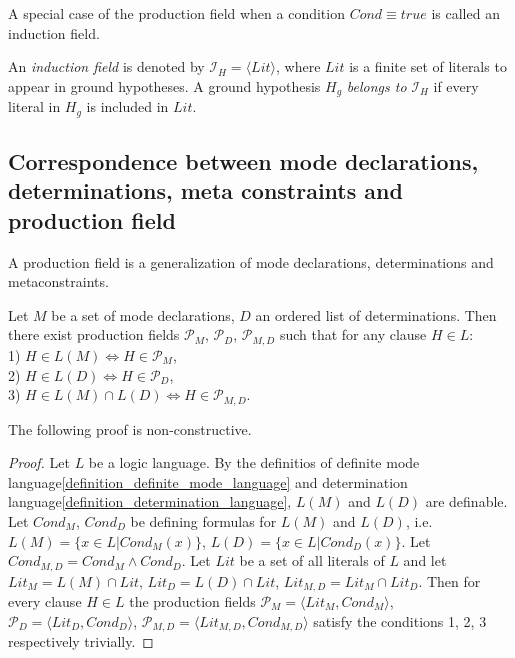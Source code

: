 A special case of the production field when a condition $Cond \equiv true$ is called an induction field.

\begin{defn}\cite{yamamoto2012inverse}\label{induction_field_definition}
An \emph{induction field} is denoted by $\mathcal{I}_H = \langle Lit \rangle$,
where $Lit$ is a finite
set of literals to appear in ground hypotheses.
A ground hypothesis $H_g$ \emph{belongs to} $\mathcal{I}_H$ if
every literal in $H_g$ is included in $Lit$.
\end{defn}

\subsection{Correspondence between mode declarations, determinations, meta constraints and production field}\label{bias_correspondence}
A production field is a generalization of mode declarations, determinations and metaconstraints.

\begin{proposition}\label{md_d_pf_correspondence_proposition}
Let $M$ be a set of mode declarations, $D$ an ordered list of determinations. Then there exist production fields
$\mathcal{P}_M$,
$\mathcal{P}_D$,
$\mathcal{P}_{M,D}$
such that for any clause $H \in L$:\\
1) $H \in L(M) \iff H \in \mathcal{P}_M$,\\
2) $H \in L(D) \iff H \in \mathcal{P}_D$,\\
3) $H \in L(M) \cap L(D) \iff H \in \mathcal{P}_{M,D}$.\\
\end{proposition}
The following proof is non-constructive.
\begin{proof}
Let $L$ be a logic language. By the definitios of definite mode language\ref{definition_definite_mode_language} and determination language\ref{definition_determination_language}, $L(M)$ and $L(D)$ are definable.
Let $Cond_M$, $Cond_D$ be defining formulas for $L(M)$ and $L(D)$, i.e. $L(M)=\{x \in L | Cond_M(x)\}$, $L(D)=\{x \in L | Cond_D(x)\}$.
Let $Cond_{M,D}=Cond_M \land Cond_D$. Let $Lit$ be a set of all literals of $L$ and let
$Lit_M=L(M) \cap Lit$,
$Lit_D=L(D) \cap Lit$,
$Lit_{M,D}=Lit_M \cap Lit_D$.
Then for every clause $H \in L$ the production fields
$\mathcal{P}_M=\langle Lit_M, Cond_M \rangle$,
$\mathcal{P}_D=\langle Lit_D, Cond_D \rangle$,
$\mathcal{P}_{M,D}=\langle Lit_{M,D}, Cond_{M,D} \rangle$
satisfy the conditions 1, 2, 3 respectively trivially.
\end{proof}


